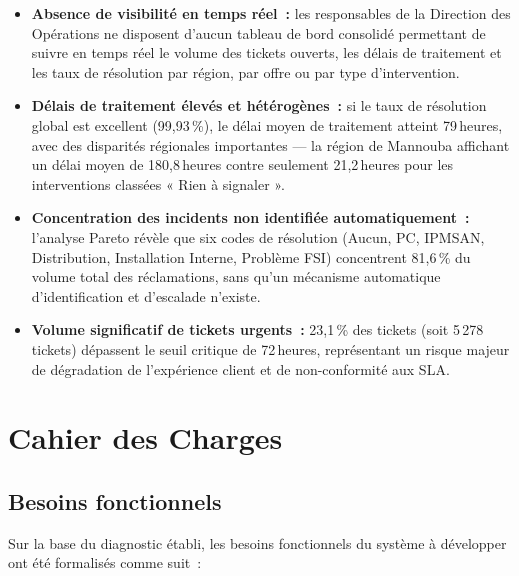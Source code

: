 \documentclass[10pt,a4paper]{report}
\begin{document}
\begin{itemize}[leftmargin=*, itemsep=8pt]
  \item \textbf{Absence de visibilité en temps réel~:} les responsables de la Direction des Opérations ne disposent d'aucun tableau de bord consolidé permettant de suivre en temps réel le volume des tickets ouverts, les délais de traitement et les taux de résolution par région, par offre ou par type d'intervention.

  \item \textbf{Délais de traitement élevés et hétérogènes~:} si le taux de résolution global est excellent (99,93\,\%), le délai moyen de traitement atteint 79\,heures, avec des disparités régionales importantes --- la région de Mannouba affichant un délai moyen de 180,8\,heures contre seulement 21,2\,heures pour les interventions classées « Rien à signaler ».

  \item \textbf{Concentration des incidents non identifiée automatiquement~:} l'analyse Pareto révèle que six codes de résolution (Aucun, PC, IPMSAN, Distribution, Installation Interne, Problème FSI) concentrent 81,6\,\% du volume total des réclamations, sans qu'un mécanisme automatique d'identification et d'escalade n'existe.

  \item \textbf{Volume significatif de tickets urgents~:} 23,1\,\% des tickets (soit 5\,278 tickets) dépassent le seuil critique de 72\,heures, représentant un risque majeur de dégradation de l'expérience client et de non-conformité aux SLA.
\end{itemize}

\section{Cahier des Charges}

\subsection{Besoins fonctionnels}

Sur la base du diagnostic établi, les besoins fonctionnels du système à développer ont été formalisés comme suit~:
\end{document}
